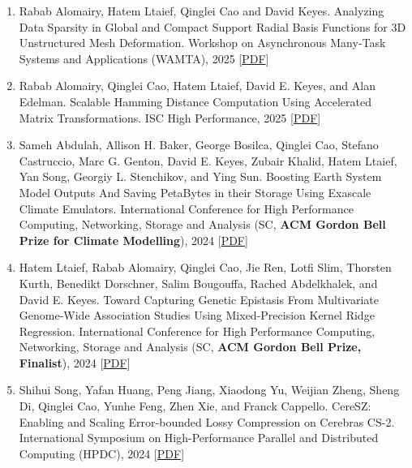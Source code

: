 \documentclass{resume} %
\let\OrigRSection\rSection
\let\OrigEndRSection\endrSection
\let\OrigMakeUppercase\MakeUppercase
\renewenvironment{rSection}[1]{
    \renewcommand{\MakeUppercase}[1]{\textcolor{blue}{\OrigMakeUppercase{##1}}}%
    \OrigRSection{#1}%
}{%
    \OrigEndRSection%
}
\begin{document}
\begin{rSection}{\faBook~Publications}
\begin{itemize}
\begin{enumerate}[leftmargin=8pt, align=left]
    \item Rabab Alomairy, Hatem Ltaief, Qinglei Cao and David Keyes. Analyzing Data Sparsity in Global and Compact Support Radial Basis Functions for 3D Unstructured Mesh Deformation. Workshop on Asynchronous Many-Task Systems and Applications (WAMTA), 2025 \hfill[\href{https://qingleicao.com/papers/2025-wamta-Analyzing Data Sparsity in Global and Compact Support Radial Basis Functions for 3D Unstructured Mesh Deformation.pdf}{PDF}]
    \item Rabab Alomairy, Qinglei Cao, Hatem Ltaief, David E. Keyes, and Alan Edelman. Scalable Hamming Distance Computation Using Accelerated Matrix Transformations. ISC High Performance, 2025 \hfill[\href{https://qingleicao.com/papers/Scalable_Hamming_Distance_Computation_Using_Accelerated_Matrix_Transformations.pdf}{PDF}]
    \item Sameh Abdulah, Allison H. Baker, George Bosilca, Qinglei Cao, Stefano Castruccio, Marc G. Genton, David E. Keyes, Zubair Khalid, Hatem Ltaief, Yan Song, Georgiy L. Stenchikov, and Ying Sun. Boosting Earth System Model Outputs And Saving PetaBytes in their Storage Using Exascale Climate Emulators. International Conference for High Performance Computing, Networking, Storage and Analysis (SC, {\bf ACM Gordon Bell Prize for Climate Modelling}), 2024  \hfill[\href{https://qingleicao.com/papers/Boosting Earth System Model Outputs And Saving PetaBytes in Their Storage Using Exascale Climate Emulators.pdf}{PDF}]
    \item Hatem Ltaief, Rabab Alomairy, Qinglei Cao, Jie Ren, Lotfi Slim, Thorsten Kurth, Benedikt Dorschner, Salim Bougouffa, Rached Abdelkhalek, and David E. Keyes. Toward Capturing Genetic Epistasis From Multivariate Genome-Wide Association Studies Using Mixed-Precision Kernel Ridge Regression. International Conference for High Performance Computing, Networking, Storage and Analysis (SC, {\bf ACM Gordon Bell Prize, Finalist}), 2024 \hfill[\href{https://qingleicao.com/papers/Toward Capturing Genetic Epistasis From Multivariate Genome-Wide Association Studies Using Mixed-Precision Kernel Ridge Regression.pdf}{PDF}]
    \item Shihui Song, Yafan Huang, Peng Jiang, Xiaodong Yu, Weijian Zheng, Sheng Di, Qinglei Cao, Yunhe Feng, Zhen Xie, and Franck Cappello. CereSZ: Enabling and Scaling Error-bounded Lossy Compression on Cerebras CS-2. International Symposium on High-Performance Parallel and Distributed Computing (HPDC), 2024 \hfill[\href{https://qingleicao.com/papers/CereSZ- Enabling and Scaling Error-bounded Lossy Compression on Cerebras CS-2.pdf}{PDF}]

\end{enumerate}
\end{itemize}
\end{rSection}
\end{document}
